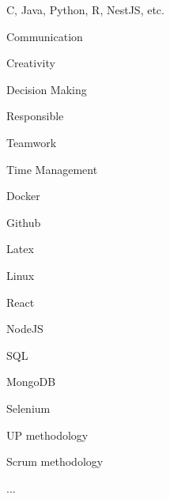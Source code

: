 \begin{cventries}
    \cventry
    {
    	\begin{cvitems}
    		C, Java, Python, R, NestJS, etc.
    	\end{cvitems}
    }
        {}
   		{}
   		{}
   		{}
        
\end{cventries}
\begin{cventries}
    \cventry
        {}
        {}
        {}
        {}
        {
            \begin{cvitems}
                \item Communication
                \item Creativity
                \item Decision Making
                \item Responsible
                \item Teamwork
                \item Time Management
            \end{cvitems}
        }
\end{cventries}
\begin{cventries}
    \cventry
        {}
        {}
        {}
        {}
        {
            \begin{cvitems}
                \item Docker
                \item Github
                \item Latex
                \item Linux
                \item React
                \item NodeJS
                \item SQL
                \item MongoDB
                \item Selenium
                \item UP methodology
                \item Scrum methodology
                \item ...
            \end{cvitems}
        }
\end{cventries}

